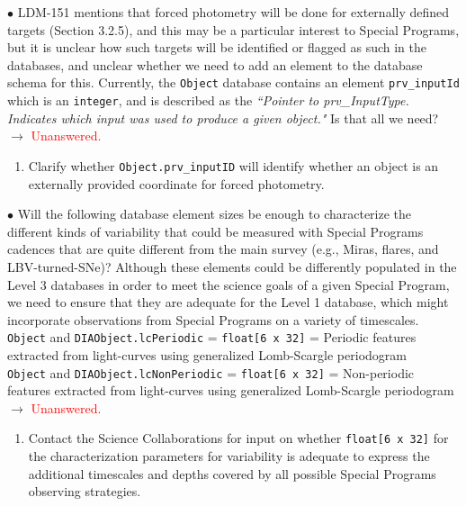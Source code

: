 \documentclass[DM,lsstdraft,toc]{lsstdoc}
\begin{document}
$\bullet$ LDM-151 mentions that forced photometry will be done for externally defined targets (Section 3.2.5), and this may be a particular interest to Special Programs, but it is unclear how such targets will be identified or flagged as such in the databases, and unclear whether we need to add an element to the database schema for this. Currently, the {\tt Object} database contains an element {\tt prv\_inputId} which is an {\tt integer}, and is described as the {\it ``Pointer to prv\_InputType. Indicates which input was used to produce a given object."} Is that all we need? \\
$\rightarrow$ \textcolor{red}{Unanswered.}
\begin{enumerate}[resume,topsep=-10pt,label= \textbf{Action \Roman*.}] \item Clarify whether {\tt Object.prv\_inputID} will identify whether an object is an externally provided coordinate for forced photometry. \end{enumerate}

$\bullet$ Will the following database element sizes be enough to characterize the different kinds of variability that could be measured with Special Programs cadences that are quite different from the main survey (e.g., Miras, flares, and LBV-turned-SNe)? Although these elements could be differently populated in the Level 3 databases in order to meet the science goals of a given Special Program, we need to ensure that they are adequate for the Level 1 database, which might incorporate observations from Special Programs on a variety of timescales. \\
{\tt Object} and {\tt DIAObject.lcPeriodic} = {\tt float[6 x 32]} = Periodic features extracted from light-curves using generalized Lomb-Scargle periodogram \\
{\tt Object} and {\tt DIAObject.lcNonPeriodic} = {\tt float[6 x 32]} = Non-periodic features extracted from light-curves using generalized Lomb-Scargle periodogram \\
$\rightarrow$ \textcolor{red}{Unanswered.}
\begin{enumerate}[resume,topsep=-10pt,label= \textbf{Action \Roman*.}] \item Contact the Science Collaborations for input on whether {\tt float[6 x 32]} for the characterization parameters for variability is adequate to express the additional timescales and depths covered by all possible Special Programs observing strategies. \end{enumerate}
\end{document}
